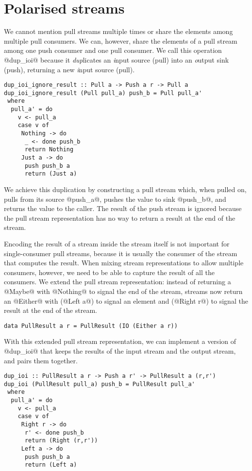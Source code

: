 \section{Polarised streams}

We cannot mention pull streams multiple times or share the elements among multiple pull consumers.
We can, however, share the elements of a pull stream among one push consumer and one pull consumer.
We call this operation @dup_ioi@ because it \emph{dup}licates an \emph{i}nput source (pull) into an \emph{o}utput sink (push), returning a new \emph{i}nput source (pull).

\begin{lstlisting}
dup_ioi_ignore_result :: Pull a -> Push a r -> Pull a
dup_ioi_ignore_result (Pull pull_a) push_b = Pull pull_a'
 where
  pull_a' = do
    v <- pull_a
    case v of
     Nothing -> do
      _ <- done push_b
      return Nothing
     Just a -> do
      push push_b a
      return (Just a)
\end{lstlisting}

We achieve this duplication by constructing a pull stream which, when pulled on, pulls from its source @push_a@, pushes the value to sink @push_b@, and returns the value to the caller.
The result of the push stream is ignored because the pull stream representation has no way to return a result at the end of the stream.

Encoding the result of a stream inside the stream itself is not important for single-consumer pull streams, because it is usually the consumer of the stream that computes the result.
When mixing stream representations to allow multiple consumers, however, we need to be able to capture the result of all the consumers.
We extend the pull stream representation: instead of returning a @Maybe@ with @Nothing@ to signal the end of the stream, streams now return an @Either@ with (@Left a@) to signal an element and (@Right r@) to signal the result at the end of the stream.

\begin{lstlisting}
data PullResult a r = PullResult (IO (Either a r))
\end{lstlisting}

With this extended pull stream representation, we can implement a version of @dup_ioi@ that keeps the results of the input stream and the output stream, and pairs them together.

\begin{lstlisting}
dup_ioi :: PullResult a r -> Push a r' -> PullResult a (r,r')
dup_ioi (PullResult pull_a) push_b = PullResult pull_a'
 where
  pull_a' = do
    v <- pull_a
    case v of
     Right r -> do
      r' <- done push_b
      return (Right (r,r'))
     Left a -> do
      push push_b a
      return (Left a)
\end{lstlisting}

